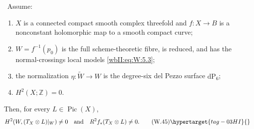 \begin{theorem}
\hypertarget{tag-03IX}{}\label{wbII:thm:candidate-conductor}

\ Assume:
\begin{enumerate}[label=(H\arabic*)]
\item $X$ is a connected compact smooth complex threefold and
$f:X\to B$ is a nonconstant holomorphic map to a smooth compact curve;
\item $W=f^{-1}(p_0)$ is the full scheme-theoretic fibre, is reduced, and
has the normal-crossings local models \eqref{wbII:eq:W:5.3};
\item the normalization $\eta:\widetilde W\to W$ is the degree-six del
Pezzo surface $\mathrm{dP}_6$;
\item $H^2(X;\mathbb Z)=0$.
\end{enumerate}
Then, for every $L\in\operatorname{Pic}(X)$,
\[
H^2(W,(T_X\otimes L)|_W)\ne0
\quad\text{and}\quad
R^2f_*(T_X\otimes L)\ne0.
\tag{W.45}\hypertarget{tag-03HI}{}\label{wbII:eq:W:5.18}
\]
\end{theorem}



